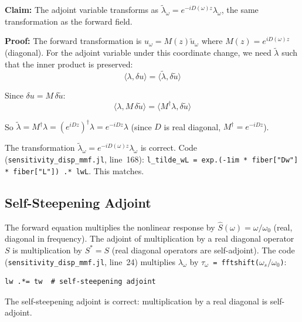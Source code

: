 \documentclass[12pt,a4paper]{article}
\theoremstyle{definition}
\begin{document}
\textbf{Claim:} The adjoint variable transforms as $\tilde{\lambda}_\omega = e^{-iD(\omega)z}\lambda_\omega$, the same transformation as the forward field.

\textbf{Proof:} The forward transformation is $u_\omega = M(z)\tilde{u}_\omega$ where $M(z) = e^{iD(\omega)z}$ (diagonal). For the adjoint variable under this coordinate change, we need $\tilde{\lambda}$ such that the inner product is preserved:
\begin{equation}
\langle \lambda, \delta u \rangle = \langle \tilde{\lambda}, \delta \tilde{u} \rangle
\end{equation}

Since $\delta u = M\,\delta\tilde{u}$:
\begin{equation}
\langle \lambda, M\,\delta\tilde{u} \rangle = \langle M^\dagger \lambda, \delta\tilde{u} \rangle
\end{equation}

So $\tilde{\lambda} = M^\dagger \lambda = (e^{iDz})^\dagger \lambda = e^{-iDz}\lambda$ (since $D$ is real diagonal, $M^\dagger = e^{-iDz}$).

\begin{verified}
The transformation $\tilde{\lambda}_\omega = e^{-iD(\omega)z}\lambda_\omega$ is correct. Code (\texttt{sensitivity\_disp\_mmf.jl}, line~168): \texttt{l\_tilde\_wL = exp.(-1im * fiber["Dw"] * fiber["L"]) .* lwL}. This matches.
\end{verified}

\subsection{Self-Steepening Adjoint}

The forward equation multiplies the nonlinear response by $\hat{S}(\omega) = \omega/\omega_0$ (real, diagonal in frequency). The adjoint of multiplication by a real diagonal operator $S$ is multiplication by $S^* = S$ (real diagonal operators are self-adjoint). The code (\texttt{sensitivity\_disp\_mmf.jl}, line~24) multiplies $\lambda_\omega$ by \texttt{$\tau_\omega$ = fftshift($\omega_s / \omega_0$)}:

\begin{lstlisting}
lw .*= tw  # self-steepening adjoint
\end{lstlisting}

\begin{verified}
The self-steepening adjoint is correct: multiplication by a real diagonal is self-adjoint.
\end{verified}
\end{document}
